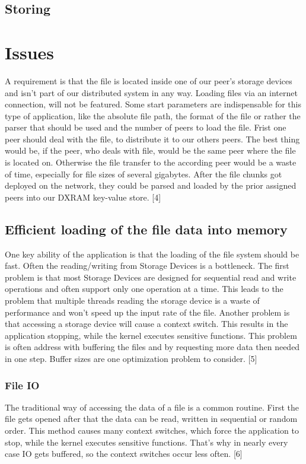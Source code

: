 \subsection{Storing}

\section{Issues}
A requirement is that the file is located inside one of our peer’s storage devices and isn’t part of our distributed system in any way. Loading files via an internet connection, will not be featured. Some start parameters are indispensable for this type of application, like the absolute file path, the format of the file or rather the parser that should be used and the number of peers to load the file.
Frist one peer should deal with the file, to distribute it to our others peers. The best thing would be, if the peer, who deals with file, would be the same peer where the file is located on. Otherwise the file transfer to the according peer would be a waste of time, especially for file sizes of several gigabytes. After the file chunks got deployed on the network, they could be parsed and loaded by the prior assigned peers into our DXRAM key-value store. [4]

\subsection{Efficient loading of the file data into memory}
One key ability of the application is that the loading of the file system should be fast. Often the reading/writing from Storage Devices is a bottleneck. The first problem is that most Storage Devices are designed for sequential read and write operations and often support only one operation at a time. This leads to the problem that multiple threads reading the storage device is a waste of performance and won’t speed up the input rate of the file. Another problem is that accessing a storage device will cause a context switch. This results in the application stopping, while the kernel executes sensitive functions. This problem is often address with buffering the files and by requesting more data then needed in one step. Buffer sizes are one optimization problem to consider. [5]

\subsubsection{File IO}
The traditional way of accessing the data of a file is a common routine. First the file gets opened after that the data can be read, written in sequential or random order. This method causes many context switches, which force the application to stop, while the kernel executes sensitive functions. That’s why in nearly every case IO gets buffered, so the context switches occur less often. [6]

